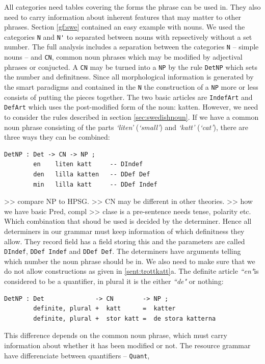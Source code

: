 \documentclass{report}
\begin{document}
All categories need tables covering the forms the phrase can be used in. They also
need to carry information about inherent features that may matter to other phrases.
Section \ref{gf:swe} contained an easy example with nouns. We used the categories \verb-N-
and \verb-N'- to separated between nouns with repsectively without a set number.
The full analysis includes a separation between the categories \verb-N- -- simple nouns --
and 
\verb-CN-, common noun phrases which may be modified by adjectival phrases or conjucted.
A \verb-CN- may be turned into a \verb-NP- by the rule \verb-DetNP- which sets
the number and definitness. Since
all morphological information is generated by the smart paradigms and contained in the \verb-N-
the construction of a \verb-NP- more or less consists of putting the pieces together.
The two basic articles are \verb-IndefArt- and \verb-DefArt- which
uses the post-modified form of the noun: katten.
However, we need to consider the rules described in section \ref{sec:swedishnoun}. If we have
a common noun phrase consisting of the parts \emph{`liten'} (\emph{`small'}) and \emph{`katt'}
(\emph{`cat'}), there are three ways they can be combined:
\begin{verbatim}
DetNP : Det -> CN -> NP ;
        en    liten katt     -- DIndef
        den   lilla katten   -- DDef Def
        min   lilla katt     -- DDef Indef
\end{verbatim}        
>> compare NP to HPSG.
>> CN may be different in other theories.
>> how we have basic Pred, compl
>> clase is a pre-sentence needs tense, polarity etc.
Which combination that shoud be used is decided by the determiner. Hence all determiners
in our grammar must keep information of which definitness they allow. They record field
has a field storing this and the parameters are called \verb-DIndef-, 
\verb-DDef Indef- and \verb-DDef Def-. The determiners have arguments telling
which number the noun phrase should be in.
We also need to make sure that we do not allow constructions as given in
\ref{sent:trottkatt}a.
The definite article  \emph{``en"}is considered to be a quantifier, in plural it
is the either \emph{``de"} or nothing:
\begin{verbatim}
DetNP : Det              -> CN        -> NP ;
        definite, plural +  katt      =  katter
        definite, plural +  stor katt =  de stora katterna
\end{verbatim}        
This difference depends on the common noun phrase, which must carry information
about whether it has been modified or not.
The resource grammar have differenciate between quantifiers -- \verb-Quant-,
\end{document}
